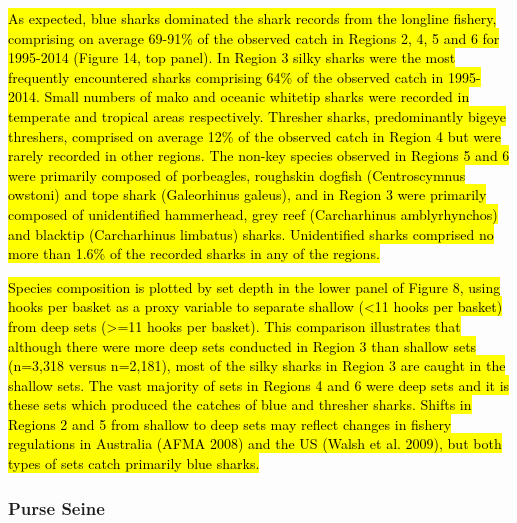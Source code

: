 \documentclass[12pt]{SCreport}
\begin{document}
  
 \hl{ As expected, blue sharks dominated the shark records from the longline fishery, comprising on average 69-91\% of the observed catch in Regions 2, 4, 5 and 6 for 1995-2014 (Figure 14, top panel). In Region 3 silky sharks were the most frequently encountered sharks comprising 64\% of the observed catch in 1995-2014. Small numbers of mako and oceanic whitetip sharks were recorded in temperate and tropical areas respectively. Thresher sharks, predominantly bigeye threshers, comprised on average 12\% of the observed catch in Region 4 but were rarely recorded in other regions. The non-key species observed in Regions 5 and 6 were primarily composed of porbeagles, roughskin dogfish (Centroscymnus owstoni) and tope shark (Galeorhinus galeus), and in Region 3 were primarily composed of unidentified hammerhead, grey reef (Carcharhinus amblyrhynchos) and blacktip (Carcharhinus limbatus) sharks. Unidentified sharks comprised no more than 1.6\% of the recorded sharks in any of the regions.}
  
 \hl{ Species composition is plotted by set depth in the lower panel of Figure 8, using hooks per basket as a proxy variable to separate shallow (<11 hooks per basket) from deep sets (>=11 hooks per basket). This comparison illustrates that although there were more deep sets conducted in Region 3 than shallow sets (n=3,318 versus n=2,181), most of the silky sharks in Region 3 are caught in the shallow sets. The vast majority of sets in Regions 4 and 6 were deep sets and it is these sets which produced the catches of blue and thresher sharks. Shifts in Regions 2 and 5 from shallow to deep sets may reflect changes in fishery regulations in Australia (AFMA 2008) and the US (Walsh et al. 2009), but both types of sets catch primarily blue sharks. }
  
  
  
  
 \subsubsection*{Purse Seine} 
 
\end{document}
